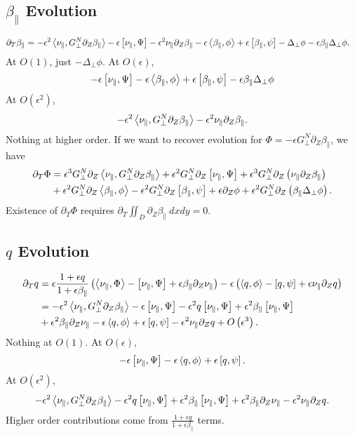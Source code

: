 \documentclass{article}
\newcommand{\para}{\parallel}
\newcommand{\ep}{\epsilon}
\newcommand{\lap}{\Delta_\perp}
\newcommand{\p}{\partial}
\newcommand{\fr}{\frac{1+\ep q}{1+\ep\beta_\para}}
\newcommand{\GN}{G_\perp^N}
\newcommand{\pth} [1] {\left( #1 \right) }
\newcommand{\br} [1] {\left[ #1 \right] }
\begin{document}
\subsection{$\beta_\para$ Evolution}
\begin{align*}
    \p_T\beta_\para &= -\ep^2\Braket{\nu_\para, \GN\p_Z\beta_\para} - \ep\br{\nu_\para, \Psi} - \ep^2\nu_\para\p_Z\beta_\para - \ep\Braket{\beta_\para, \phi} + \ep\br{\beta_\para, \psi} - \lap\phi - \ep\beta_\para\lap\phi. 
\end{align*}
At $O(1)$, just $-\lap\phi$. At $O(\ep)$, 
\begin{align*}
    - \ep\br{\nu_\para, \Psi} - \ep\Braket{\beta_\para, \phi} + \ep\br{\beta_\para, \psi} - \ep\beta_\para\lap\phi
\end{align*}
At $O\pth{\ep^2}$, 
\begin{align*}
    -\ep^2\Braket{\nu_\para, \GN\p_Z\beta_\para} - \ep^2 \nu_\para\p_Z\beta_\para. 
\end{align*}
Nothing at higher order. If we want to recover evolution for $\Phi = -\ep\GN\p_Z\beta_\para$, we have 
\begin{align*}
    \p_T\Phi &= \ep^3\GN\p_Z\Braket{\nu_\para, \GN\p_Z \beta_\para} + \ep^2\GN\p_Z\br{\nu_\para, \Psi} + \ep^3\GN\p_Z \pth{\nu_\para\p_Z\beta_\para} \\ 
    &+ \ep^2\GN\p_Z \Braket{\beta_\para, \phi} - \ep^2\GN\p_Z\br{\beta_\para, \psi} + \ep\p_Z\phi + \ep^2\GN\p_Z \pth{\beta_\para\lap\phi}. 
\end{align*}
Existence of $\p_T\Phi$ requires $\p_T \iint_D \p_Z\beta_\para\ dxdy = 0$. 


\subsection{$q$ Evolution}
\begin{align*}
    \p_T q &= \ep\fr \pth{\Braket{\nu_\para, \Phi} - \br{\nu_\para, \Psi} + \ep\beta_\para\p_Z\nu_\para} - \ep \pth{\Braket{q, \phi} - \br{q, \psi} + \ep\nu_\para\p_Zq} \\ 
    &= -\ep^2\Braket{\nu_\para, \GN\p_Z\beta_\para} - \ep\br{\nu_\para, \Psi} - \ep^2q\br{\nu_\para, \Psi} + \ep^2\beta_\para\br{\nu_\para, \Psi} \\ 
    &+ \ep^2\beta_\para\p_Z\nu_\para - \ep\Braket{q, \phi} + \ep\br{q, \psi} - \ep^2\nu_\para\p_Zq + O\pth{\ep^3}. 
\end{align*}
Nothing at $O(1)$. At $O(\ep)$, 
\begin{align*}
    - \ep\br{\nu_\para, \Psi} - \ep\Braket{q, \phi} + \ep\br{q, \psi}. 
\end{align*}
At $O\pth{\ep^2}$, 
\begin{align*}
    -\ep^2\Braket{\nu_\para, \GN\p_Z\beta_\para} - \ep^2q\br{\nu_\para, \Psi} + \ep^2\beta_\para\br{\nu_\para, \Psi} + \ep^2\beta_\para\p_Z\nu_\para - \ep^2\nu_\para\p_Zq. 
\end{align*}
Higher order contributions come from $\fr$ terms.
\end{document}
